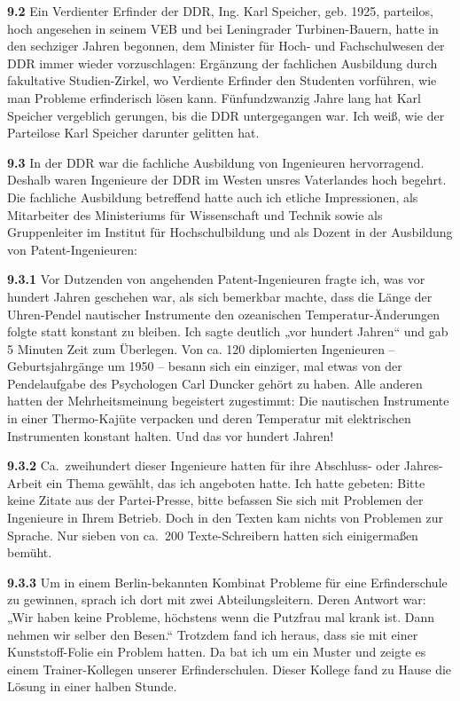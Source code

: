 \documentclass[12pt,a4paper]{article}
\begin{document}
\textbf{9.2} Ein Verdienter Erfinder der DDR, Ing. Karl Speicher, geb. 1925,
parteilos, hoch angesehen in seinem VEB und bei Leningrader Turbinen-Bauern,
hatte in den sechziger Jahren begonnen, dem Minister für Hoch- und
Fachschulwesen der DDR immer wieder vorzuschlagen: Ergänzung der fachlichen
Ausbildung durch fakultative Studien-Zirkel, wo Verdiente Erfinder den
Studenten vorführen, wie man Probleme erfinderisch lösen kann. Fünfundzwanzig
Jahre lang hat Karl Speicher vergeblich gerungen, bis die DDR untergegangen
war. Ich weiß, wie der Parteilose Karl Speicher darunter gelitten hat.

\textbf{9.3} In der DDR war die fachliche Ausbildung von Ingenieuren
hervorragend. Deshalb waren Ingenieure der DDR im Westen unsres Vaterlandes
hoch begehrt. Die fachliche Ausbildung betreffend hatte auch ich etliche
Impressionen, als Mitarbeiter des Ministeriums für Wissenschaft und Technik
sowie als Gruppenleiter im Institut für Hochschulbildung und als Dozent in der
Ausbildung von Patent-Ingenieuren:

\textbf{9.3.1} Vor Dutzenden von angehenden Patent-Ingenieuren fragte ich, was
vor hundert Jahren geschehen war, als sich bemerkbar machte, dass die Länge der
Uhren-Pendel nautischer Instrumente den ozeanischen Temperatur-Änderungen
folgte statt konstant zu bleiben. Ich sagte deutlich „vor hundert Jahren“ und
gab 5 Minuten Zeit zum Überlegen. Von ca. 120 diplomierten Ingenieuren –
Geburtsjahrgänge um 1950 – besann sich ein einziger, mal etwas von der
Pendelaufgabe des Psychologen Carl Duncker gehört zu haben. Alle anderen hatten
der Mehrheitsmeinung begeistert zugestimmt: Die nautischen Instrumente in einer
Thermo-Kajüte verpacken und deren Temperatur mit elektrischen Instrumenten
konstant halten. Und das vor hundert Jahren!

\textbf{9.3.2} Ca.\ zweihundert dieser Ingenieure hatten für ihre Abschluss-
oder Jahres-Arbeit ein Thema gewählt, das ich angeboten hatte. Ich hatte
gebeten: Bitte keine Zitate aus der Partei-Presse, bitte befassen Sie sich mit
Problemen der Ingenieure in Ihrem Betrieb. Doch in den Texten kam nichts von
Problemen zur Sprache. Nur sieben von ca.\ 200 Texte-Schreibern hatten sich
einigermaßen bemüht.

\textbf{9.3.3} Um in einem Berlin-bekannten Kombinat Probleme für eine
Erfinderschule zu gewinnen, sprach ich dort mit zwei Abteilungsleitern. Deren
Antwort war: „Wir haben keine Probleme, höchstens wenn die Putzfrau mal krank
ist. Dann nehmen wir selber den Besen.“ Trotzdem fand ich heraus, dass sie mit
einer Kunststoff-Folie ein Problem hatten. Da bat ich um ein Muster und zeigte
es einem Trainer-Kollegen unserer Erfinderschulen. Dieser Kollege fand zu Hause
die Lösung in einer halben Stunde.
\end{document}
